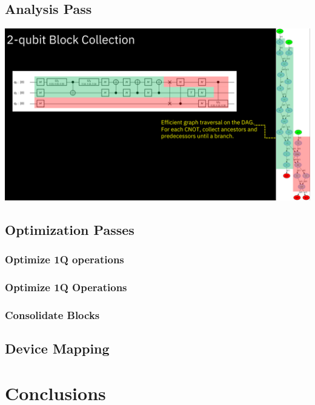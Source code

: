 \documentclass[aspectratio=169,11pt,hyperref={colorlinks=true}]{beamer}
\begin{document}
\subsection{Analysis Pass}
{
\begin{frame}
    \includegraphics[width=\textwidth]{block_collection.png}
\end{frame}
}

\subsection{Optimization Passes}
\subsubsection{Optimize 1Q operations}
\begin{frame}
    \frametitle{Optimize 1Q Operations}
\end{frame}

\subsubsection{Consolidate Blocks}

\begin{frame}

\end{frame}
\subsection{Device Mapping}

\section{Conclusions}
\end{document}
